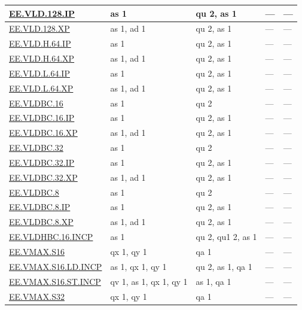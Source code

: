 \begin{longtable}[c]{|l|m{2.5cm}|m{2.5cm}|m{2.5cm}|m{2.5cm}|}
    \hyperref[instruction:EEVLD128IP]{EE.VLD.128.IP} & as 1 & qu 2, as 1 & — & — \\\hline
    \hyperref[instruction:EEVLD128XP]{EE.VLD.128.XP} & as 1, ad 1 & qu 2, as 1 & — & — \\\hline
    \hyperref[instruction:EEVLDH64IP]{EE.VLD.H.64.IP} & as 1 & qu 2, as 1 & — & — \\\hline
    \hyperref[instruction:EEVLDH64XP]{EE.VLD.H.64.XP} & as 1, ad 1 & qu 2, as 1 & — & — \\\hline
    \hyperref[instruction:EEVLDL64IP]{EE.VLD.L.64.IP} & as 1 & qu 2, as 1 & — & — \\\hline
    \hyperref[instruction:EEVLDL64XP]{EE.VLD.L.64.XP} & as 1, ad 1 & qu 2, as 1 & — & — \\\hline
    \hyperref[instruction:EEVLDBC16]{EE.VLDBC.16} & as 1 & qu 2 & — & — \\\hline
    \hyperref[instruction:EEVLDBC16IP]{EE.VLDBC.16.IP} & as 1 & qu 2, as 1 & — & — \\\hline
    \hyperref[instruction:EEVLDBC16XP]{EE.VLDBC.16.XP} & as 1, ad 1 & qu 2, as 1 & — & — \\\hline
    \hyperref[instruction:EEVLDBC32]{EE.VLDBC.32} & as 1 & qu 2 & — & — \\\hline
    \hyperref[instruction:EEVLDBC32IP]{EE.VLDBC.32.IP} & as 1 & qu 2, as 1 & — & — \\\hline
    \hyperref[instruction:EEVLDBC32XP]{EE.VLDBC.32.XP} & as 1, ad 1 & qu 2, as 1 & — & — \\\hline
    \hyperref[instruction:EEVLDBC8]{EE.VLDBC.8} & as 1 & qu 2 & — & — \\\hline
    \hyperref[instruction:EEVLDBC8IP]{EE.VLDBC.8.IP} & as 1 & qu 2, as 1 & — & — \\\hline
    \hyperref[instruction:EEVLDBC8XP]{EE.VLDBC.8.XP} & as 1, ad 1 & qu 2, as 1 & — & — \\\hline
    \hyperref[instruction:EEVLDHBC16INCP]{EE.VLDHBC.16.INCP} & as 1 & qu 2, qu1 2, as 1 & — & — \\\hline
    \hyperref[instruction:EEVMAXS16]{EE.VMAX.S16} & qx 1, qy 1 & qa 1 & — & — \\\hline
    \hyperref[instruction:EEVMAXS16LDINCP]{EE.VMAX.S16.LD.INCP} & as 1, qx 1, qy 1 & qu 2, as 1, qa 1 & — & — \\\hline
    \hyperref[instruction:EEVMAXS16STINCP]{EE.VMAX.S16.ST.INCP} & qv 1, as 1, qx 1, qy 1 & as 1, qa 1 & — & — \\\hline
    \hyperref[instruction:EEVMAXS32]{EE.VMAX.S32} & qx 1, qy 1 & qa 1 & — & — \\\hline

\end{longtable}
